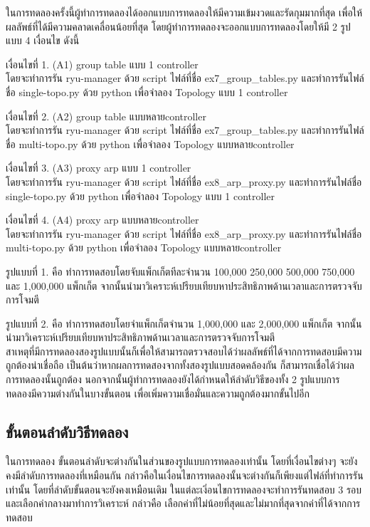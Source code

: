 ในการทดลองครั้งนี้ผู้ทำการทดลองได้ออกแบบการทดลองให้มีความเข้มงวดและรัดกุมมากที่สุด เพื่อให้ผลลัพธ์ที่ได้มีความคลาดเคลื่อนน้อยที่สุด
โดยผู้ทำการทดลองจะออกแบบการทดลองโดยให้มี 2 รูปแบบ 4 เงื่อนไข ดังนี้


เงื่อนไขที่ 1. (A1) group table แบบ 1 \gls{controller}\\
โดยจะทำการรัน ryu-manager ด้วย script ไฟล์ที่ชื่อ ex7\_group\_tables.py 
และทำการรันไฟล์ชื่อ single-topo.py ด้วย python เพื่อจำลอง Topology แบบ 1 \gls{controller}


เงื่อนไขที่ 2. (A2) group table แบบหลาย\gls{controller} \\
โดยจะทำการรัน ryu-manager ด้วย script ไฟล์ที่ชื่อ ex7\_group\_tables.py 
และทำการรันไฟล์ชื่อ multi-topo.py ด้วย python เพื่อจำลอง Topology แบบหลาย\gls{controller}


เงื่อนไขที่ 3. (A3) proxy arp แบบ 1 \gls{controller}\\
โดยจะทำการรัน ryu-manager ด้วย script ไฟล์ที่ชื่อ ex8\_arp\_proxy.py
และทำการรันไฟล์ชื่อ single-topo.py ด้วย python เพื่อจำลอง Topology แบบ 1 \gls{controller}

เงื่อนไขที่ 4. (A4) proxy arp แบบหลาย\gls{controller} \\
โดยจะทำการรัน ryu-manager ด้วย script ไฟล์ที่ชื่อ ex8\_arp\_proxy.py 
และทำการรันไฟล์ชื่อ multi-topo.py ด้วย python เพื่อจำลอง Topology แบบหลาย\gls{controller}

รูปแบบที่ 1. คือ ทำการทดสอบโดยจับแพ็กเก็ตทีละจำนวน 100,000 250,000 500,000 750,000 และ 1,000,000 แพ็กเก็ต
จากนั้นนำมาวิเคราะห์เปรียบเทียบหาประสิทธิภาพด้านเวลาและการตรวจจับการโจมตี

รูปแบบที่ 2. คือ ทำการทดสอบโดยจำแพ็กเก็ตจำนวน 1,000,000 และ 2,000,000 แพ็กเก็ต
จากนั้นนำมาวิเคราะห์เปรียบเทียบหาประสิทธิภาพด้านเวลาและการตรวจจับการโจมตี
\\

สาเหตุที่มีการทดลองสองรูปแบบนั้นก็เพื่อให้สามารถตรวจสอบได้ว่าผลลัพธ์ที่ได้จากการทดสอบมีความถูกต้องน่าเชื่อถือ
เป็นต้นว่าหากผลการทดสองจากทั้งสองรูปแบบสอดคล้องกัน ก็สามารถเชื่อได้ว่าผลการทดลองนั้นถูกต้อง นอกจากนั้นผู้ทำการทดลองยังได้กำหนดให้ลำดับวิธีของทั้ง 2 รูปแบบการทดลองมีความต่างกันในบางขั้นตอน เพื่อเพิ่มความเชื่อมั่นและความถูกต้องมากขั้นไปอีก
\\
\subsection{ขั้นตอนลำดับวิธีทดลอง}
ในการทดลอง ขั้นตอนลำดับจะต่างกันในส่วนของรูปแบบการทดลองเท่านั้น โดยที่เงื่อนไขต่างๆ จะยังคงมีลำดับการทดลองที่เหมือนกัน กล่าวคือในเงื่อนไขการทดลองนั้นจะต่างกันก็เพียงแต่ไฟล์ที่ทำการรันเท่านั้น โดยที่ลำดับขั้นตอนจะยังคงเหมือนเดิม 
ในแต่ละเงิ่อนไขการทดลองจะทำการรันทดสอบ 3 รอบ และเลือกค่ากลางมาทำการวิเคราะห์ กล่าวคือ เลือกค่าที่ไม่น้อยที่สุดและไม่มากที่สุดจากค่าที่ได้จากการทดสอบ

